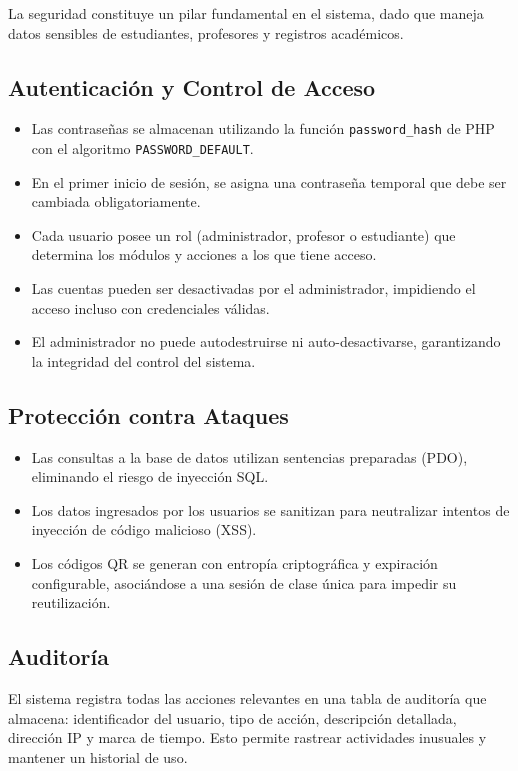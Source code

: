 \documentclass[12pt, letterpaper, oneside]{report}
\begin{document}
La seguridad constituye un pilar fundamental en el sistema, dado que maneja datos sensibles de estudiantes, profesores y registros acad\'emicos.

\subsection{Autenticaci\'on y Control de Acceso}

\begin{itemize}
  \item Las contrase\~nas se almacenan utilizando la funci\'on \texttt{password\_hash} de PHP con el algoritmo \texttt{PASSWORD\_DEFAULT}.
  \item En el primer inicio de sesi\'on, se asigna una contrase\~na temporal que debe ser cambiada obligatoriamente.
  \item Cada usuario posee un rol (administrador, profesor o estudiante) que determina los m\'odulos y acciones a los que tiene acceso.
  \item Las cuentas pueden ser desactivadas por el administrador, impidiendo el acceso incluso con credenciales v\'alidas.
  \item El administrador no puede autodestruirse ni auto-desactivarse, garantizando la integridad del control del sistema.
\end{itemize}

\subsection{Protecci\'on contra Ataques}

\begin{itemize}
  \item Las consultas a la base de datos utilizan sentencias preparadas (PDO), eliminando el riesgo de inyecci\'on SQL.
  \item Los datos ingresados por los usuarios se sanitizan para neutralizar intentos de inyecci\'on de c\'odigo malicioso (XSS).
  \item Los c\'odigos QR se generan con entrop\'ia criptogr\'afica y expiraci\'on configurable, asoci\'andose a una sesi\'on de clase \'unica para impedir su reutilizaci\'on.
\end{itemize}

\subsection{Auditor\'ia}

El sistema registra todas las acciones relevantes en una tabla de auditor\'ia que almacena: identificador del usuario, tipo de acci\'on, descripci\'on detallada, direcci\'on IP y marca de tiempo. Esto permite rastrear actividades inusuales y mantener un historial de uso.
\end{document}
